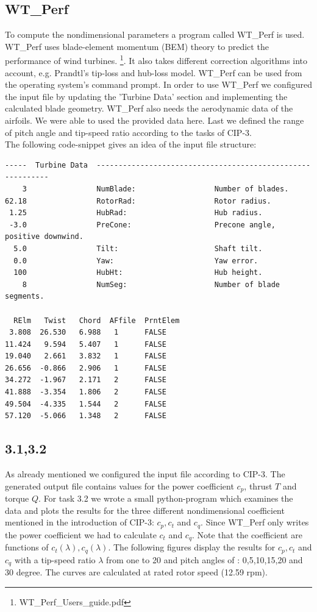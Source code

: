\documentclass[10pt]{article}
\begin{document}
\subsection{WT\_Perf}
To compute the nondimensional parameters a program called WT\_Perf is used. 
WT\_Perf uses blade-element momentum (BEM) theory to predict the performance of wind turbines. \footnote{WT\_Perf\_Users\_guide.pdf}. It also takes different correction algorithms into account, e.g. Prandtl's tip-loss and hub-loss model.
WT\_Perf can be used from the operating system's command prompt. In order to use WT\_Perf  we configured the input file by updating the 'Turbine Data' section and implementing the calculated blade geometry. WT\_Perf also needs the aerodynamic data of the airfoils. We were able to used the provided data here. Last we defined the range of pitch angle and tip-speed ratio according to the tasks of CIP-3. \\
The following code-snippet gives an idea of the input file structure:
\newpage
\begin{lstlisting}
-----  Turbine Data  -----------------------------------------------------------
    3                NumBlade:                  Number of blades.
62.18                RotorRad:                  Rotor radius.
 1.25                HubRad:                    Hub radius. 
 -3.0                PreCone:                   Precone angle, positive downwind.
  5.0                Tilt:                      Shaft tilt.
  0.0                Yaw:                       Yaw error.
  100                HubHt:                     Hub height.
    8                NumSeg:                    Number of blade segments.

  RElm   Twist   Chord  AFfile  PrntElem
 3.808  26.530   6.988	 1	    FALSE
11.424	 9.594   5.407	 1      FALSE
19.040	 2.661   3.832	 1	    FALSE
26.656	-0.866	 2.906	 1	    FALSE
34.272	-1.967   2.171	 2	    FALSE
41.888	-3.354   1.806	 2	    FALSE
49.504	-4.335   1.544	 2	    FALSE
57.120	-5.066   1.348	 2	    FALSE
\end{lstlisting}
\subsection{3.1,3.2}
As already mentioned we configured the input file according to CIP-3. The generated output file contains values for the power coefficient $c_p$, thrust $T$ and torque $Q$.
For task 3.2 we wrote a small python-program which examines the data and plots the results for the three different nondimensional coefficient mentioned in the introduction of CIP-3: $c_p, c_t$ and $c_q$. Since WT\_Perf only writes the power coefficient we had to calculate $c_t$ and $c_q$. Note that the coefficient are functions of $c_t(\lambda), c_q(\lambda)$.
The following figures display the results for $c_p, c_t$ and $c_q$ with a tip-speed ratio $\lambda$ from one to 20 and pitch angles of : 0,5,10,15,20 and 30 degree. The curves are calculated at rated rotor speed (12.59 rpm).
\end{document}
